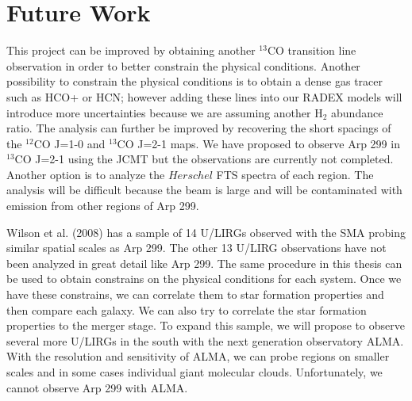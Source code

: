 \chapter{Future Work}

This project can be improved by obtaining another $^{13}$CO transition line observation in order to better constrain the physical conditions. Another possibility to constrain the physical conditions is to obtain a dense gas tracer such as HCO+ or HCN; however adding these lines into our RADEX models will introduce more uncertainties because we are assuming another H$_{2}$ abundance ratio. The analysis can further be improved by recovering the short spacings of the $^{12}$CO J=1-0 and $^{13}$CO J=2-1 maps. We have proposed to observe Arp 299 in $^{13}$CO J=2-1 using the JCMT but the observations are currently not completed. Another option is to analyze the $Herschel$ FTS spectra of each region. The analysis will be difficult because the beam is large and will be contaminated with emission from other regions of Arp 299. 

Wilson et al. (2008) has a sample of 14 U/LIRGs observed with the SMA probing similar spatial scales as Arp 299. The other 13 U/LIRG observations have not been analyzed in great detail like Arp 299. The same procedure in this thesis can be used to obtain constrains on the physical conditions for each system. Once we have these constrains, we can correlate them to star formation properties and then compare each galaxy. We can also try to correlate the star formation properties to the merger stage. To expand this sample, we will propose to observe several more U/LIRGs in the south with the next generation observatory ALMA.  With the resolution and sensitivity of ALMA, we can probe regions on smaller scales and in some cases individual giant molecular clouds. Unfortunately, we cannot observe Arp 299 with ALMA. 